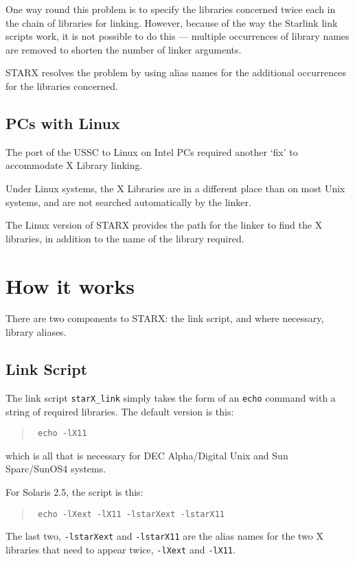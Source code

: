 One way round this problem is to specify the libraries concerned twice
each in the chain of libraries for linking. However, because of the
way the Starlink link scripts work, it is not possible to do this ---
multiple occurrences of library names are removed to shorten the number
of linker arguments.

STARX resolves the problem by using alias names for the additional
occurrences for the libraries concerned.

\subsection{PCs with Linux}

The port of the USSC to Linux on Intel PCs required another `fix' to
accommodate X Library linking.

Under Linux systems, the X Libraries are in a different place than on
most Unix systems, and are not searched automatically by the linker.

The Linux version of STARX provides the path for the linker to find the
X libraries, in addition to the name of the library required.

\section{How it works}

There are two components to STARX: the link script, and where
necessary, library aliases.

\subsection{Link Script}

The link script {\tt starX\_link} simply takes the form of an {\tt echo}
command with a string of required libraries.  The default version is
this:

\begin{quote}{\tt
echo -lX11}
\end{quote}

which is all that is necessary for DEC Alpha/Digital Unix and Sun Sparc/SunOS4
systems.

For Solaris 2.5, the script is this:

\begin{quote}{\tt
echo -lXext -lX11 -lstarXext -lstarX11}
\end{quote}

The last two, {\tt  -lstarXext} and {\tt -lstarX11} are the alias names for
the two X libraries that need to appear twice, {\tt -lXext} and {\tt -lX11}.

